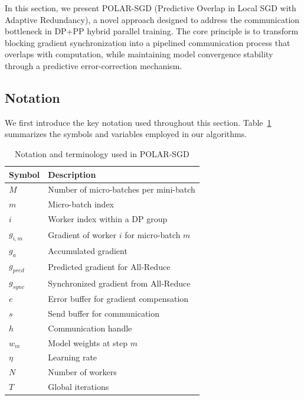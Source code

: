 

\label{sec:design}

In this section, we present POLAR-SGD (Predictive Overlap in Local SGD with Adaptive Redundancy), a novel approach designed to address the communication bottleneck in DP+PP hybrid parallel training. The core principle is to transform blocking gradient synchronization into a pipelined communication process that overlaps with computation, while maintaining model convergence stability through a predictive error-correction mechanism. 

\subsection{Notation}

We first introduce the key notation used throughout this section.  Table~\ref{tab:notation} summarizes the symbols and variables employed in our algorithms.

\begin{table}[ht]
\centering
\caption{Notation and terminology used in POLAR-SGD}
\label{tab:notation}
\begin{tabular}{ll}
\hline
\textbf{Symbol} & \textbf{Description} \\
\hline
$M$ & Number of micro-batches per mini-batch \\
$m$ & Micro-batch index \\
$i$ & Worker index within a DP group \\
$g_{i,m}$ & Gradient of worker $i$ for micro-batch $m$ \\
$g_a$ & Accumulated gradient \\
$g_{pred}$ & Predicted gradient for All-Reduce \\
$g_{sync}$ & Synchronized gradient from All-Reduce \\
$e$ & Error buffer for gradient compensation \\
$s$ & Send buffer for communication \\
$h$ & Communication handle \\
$w_m$ & Model weights at step $m$ \\
$\eta$ & Learning rate \\
$N$ & Number of workers \\
$T$ & Global iterations \\
\hline
\end{tabular}
\end{table}

